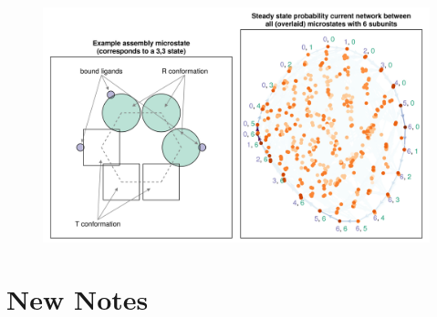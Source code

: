 \documentclass[11pt]{article}
\begin{document}
\begin{figure}[H]
	\centering
	\includegraphics[width=\textwidth]{figure.png}
	\caption{
	}\label{fig:onlyfigure}
\end{figure}

\vspace{1em}

\printbibliography

%
\newpage
\section{New Notes}
\end{document}
